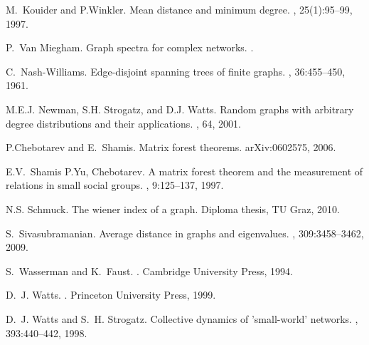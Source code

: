\documentclass[12pt]{amsart}
\theoremstyle{definition}
\begin{document}
\begin{thebibliography}{10}
M.~Kouider and P.Winkler.
\newblock Mean distance and minimum degree.
, 25(1):95--99, 1997.

P.~Van Miegham.
\newblock Graph spectra for complex networks.
.

C.~Nash-Williams.
\newblock Edge-disjoint spanning trees of finite graphs.
, 36:455--450, 1961.

M.E.J. Newman, S.H. Strogatz, and D.J. Watts.
\newblock Random graphs with arbitrary degree distributions and their
  applications.
, 64, 2001.

P.Chebotarev and E.~Shamis.
\newblock Matrix forest theorems.
\newblock arXiv:0602575, 2006.

E.V.~Shamis P.Yu, Chebotarev.
\newblock A matrix forest theorem and the measurement of relations in small
  social groups.
, 9:125--137, 1997.

N.S. Schmuck.
\newblock The wiener index of a graph.
\newblock Diploma thesis, TU Graz, 2010.

S.~Sivasubramanian.
\newblock Average distance in graphs and eigenvalues.
, 309:3458--3462, 2009.

S.~Wasserman and K.~Faust.
.
\newblock Cambridge University Press, 1994.

D.~J. Watts.
.
\newblock Princeton University Press, 1999.

D.~J. Watts and S.~H. Strogatz.
\newblock Collective dynamics of 'small-world' networks.
, 393:440--442, 1998.

\end{thebibliography}
\end{document}
